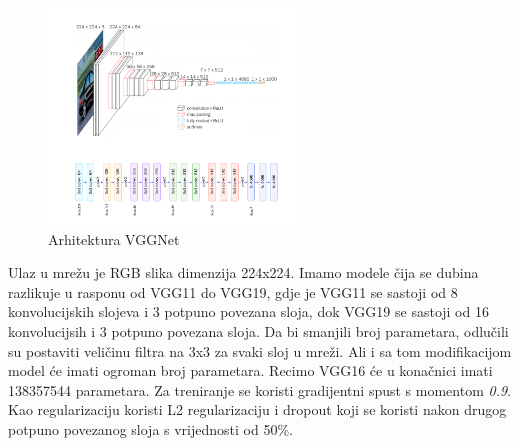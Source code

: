\FloatBarrier
\begin{figure}[h]
    \centering
    \includegraphics[width=0.6\textwidth]{images/VGGNet}
    \caption{Arhitektura VGGNet}
    \label{fig:slika10}
\end{figure}
\FloatBarrier

Ulaz u mrežu je RGB slika dimenzija 224x224.
Imamo modele čija se dubina razlikuje u rasponu od VGG11 do VGG19, gdje je VGG11 se sastoji od 8 konvolucijskih slojeva i 3 potpuno povezana sloja, dok VGG19 se sastoji od 16 konvolucijsih i 3 potpuno povezana sloja.
Da bi smanjili broj parametara, odlučili su postaviti veličinu filtra na 3x3 za svaki sloj u mreži.
Ali i sa tom modifikacijom model će imati ogroman broj parametara.
Recimo VGG16 će u konačnici imati 138357544 parametara.
Za treniranje se koristi gradijentni spust s momentom \emph{0.9}.
Kao regularizaciju koristi L2 regularizaciju i dropout koji se koristi nakon drugog potpuno povezanog sloja s vrijednosti od 50\%.

